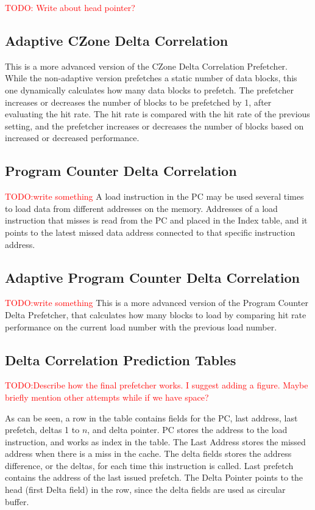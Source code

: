 \documentclass[a4paper]{IEEEtran}
\newcommand\TODO[1]{\textcolor{red}{TODO:#1}}
\newcommand\todo[1]{\TODO{#1}}
\begin{document}
\todo{ Write about head pointer?} \break

\subsection{Adaptive CZone Delta Correlation}
This is a more advanced version of the CZone Delta Correlation Prefetcher.
While the non-adaptive version prefetches a static number of data blocks, this one dynamically calculates how many data blocks to prefetch.
The prefetcher increases or decreases the number of blocks to be prefetched by 1, after evaluating the hit rate.
The hit rate is compared with the hit rate of the previous setting, and the prefetcher increases or decreases the number of blocks based on increased or decreased performance. 

\subsection{Program Counter Delta Correlation}
\todo{write something}
A load instruction in the PC may be used several times to load data from different addresses on the memory.
Addresses of a load instruction that misses is read from the PC and placed in the Index table, and it points to the latest missed data address connected to that specific instruction address. 

\subsection{Adaptive Program Counter Delta Correlation}
\todo{write something}
This is a more advanced version of the Program Counter Delta Prefetcher, that calculates how many blocks to load by comparing hit rate performance on the current load number with the previous load number.

\subsection{Delta Correlation Prediction Tables}

\todo{Describe how the final prefetcher works. I suggest adding a figure. Maybe briefly mention other attempts while if we have space?}


As can be seen, a row in the table contains fields for the PC, last address, last prefetch, deltas 1 to $ n $, and delta pointer.
PC stores the address to the load instruction, and works as index in the table.
The Last Address stores the missed address when there is a miss in the cache.
The delta fields stores the address difference, or the deltas, for each time this instruction is called.
Last prefetch contains the address of the last issued prefetch.
The Delta Pointer points to the head (first Delta field) in the row, since the delta fields are used as circular buffer.
\end{document}
